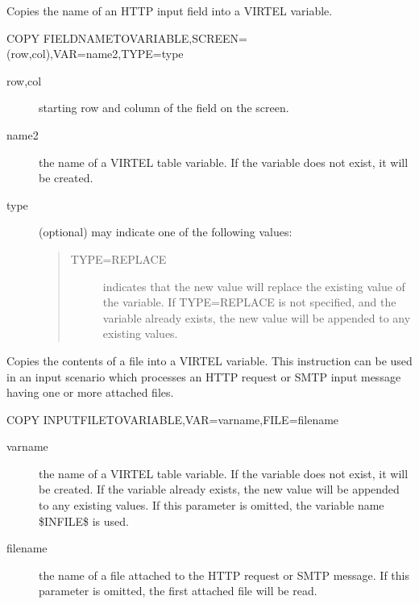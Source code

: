 \documentclass[letterpaper,10pt,english]{sphinxmanual}
\begin{document}

Copies the name of an HTTP input field into a VIRTEL variable.

\begin{sphinxVerbatim}[commandchars=\\\{\}]
COPY\PYGZdl{} FIELD\PYGZhy{}NAME\PYGZhy{}TO\PYGZhy{}VARIABLE,SCREEN=(row,col),VAR=\PYGZsq{}name2\PYGZsq{},TYPE=type
\end{sphinxVerbatim}
\begin{description}
\item[{row,col}] \leavevmode
starting row and column of the field on the screen.

\item[{name2}] \leavevmode
the name of a VIRTEL table variable. If the variable does not exist, it will be created.

\item[{type}] \leavevmode
(optional) may indicate one of the following values:
\begin{quote}
\begin{description}
\item[{TYPE=REPLACE}] \leavevmode
indicates that the new value will replace the existing value of the variable. If TYPE=REPLACE is not specified, and the variable already exists, the new value will be appended to any existing values.

\end{description}
\end{quote}

\end{description}


Copies the contents of a file into a VIRTEL variable. This instruction can be used in an input scenario which processes an HTTP request or SMTP input message having one or more attached files.

\begin{sphinxVerbatim}[commandchars=\\\{\}]
COPY\PYGZdl{} INPUT\PYGZhy{}FILE\PYGZhy{}TO\PYGZhy{}VARIABLE,VAR=\PYGZsq{}varname\PYGZsq{},FILE=\PYGZsq{}filename\PYGZsq{}
\end{sphinxVerbatim}
\begin{description}
\item[{varname}] \leavevmode
the name of a VIRTEL table variable. If the variable does not exist, it will be created. If the variable already exists, the new value will be appended to any existing values. If this parameter is omitted, the variable name \$INFILE\$ is used.

\item[{filename}] \leavevmode
the name of a file attached to the HTTP request or SMTP message. If this parameter is omitted, the first attached file will be read.

\end{description}
\end{document}
